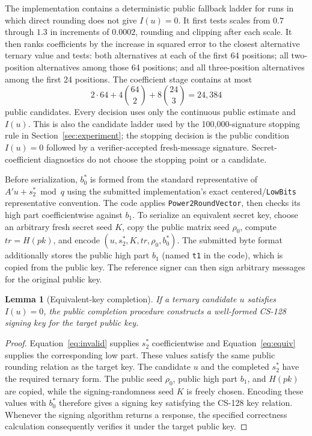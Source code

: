 \documentclass[11pt]{article}
\newtheorem{lemma}{Lemma}
\begin{document}
The implementation contains a deterministic public fallback ladder for runs in which direct
rounding does not give $I(u)=0$.  It first tests scales from $0.7$ through $1.3$ in increments
of $0.0002$, rounding and clipping after each scale.  It then ranks coefficients by the increase
in squared error to the closest alternative ternary value and tests: both alternatives at each
of the first 64 positions; all two-position alternatives among those 64 positions; and all
three-position alternatives among the first 24 positions.  The coefficient stage contains at
most
\[
 2\cdot64+4\binom{64}{2}+8\binom{24}{3}=24{,}384
\]
public candidates.  Every decision uses only the continuous public estimate and $I(u)$.  This
is also the candidate ladder used by the 100,000-signature stopping rule in
Section~\ref{sec:experiment}; the stopping decision is the public condition $I(u)=0$ followed
by a verifier-accepted fresh-message signature.  Secret-coefficient diagnostics do not choose
the stopping point or a candidate.

Before serialization, $b_0^*$ is formed from the standard representative of
$A'u+s_2^*\bmod q$ using the submitted implementation's exact centered/\texttt{LowBits}
representative convention.  The code applies \texttt{Power2RoundVector}, then checks its high
part coefficientwise against $b_1$.  To serialize an equivalent secret key, choose an
arbitrary fresh secret seed $K$, copy the public matrix seed $\rho_0$, compute
$\mathit{tr}=H(\mathit{pk})$, and encode
$(u,s_2^*,K,\mathit{tr},\rho_0,b_0^*)$.  The submitted byte format additionally stores the
public high part $b_1$ (named \texttt{t1} in the code), which is copied from the public key.
The reference signer can then sign arbitrary messages for the original public key.

\begin{lemma}[Equivalent-key completion]
If a ternary candidate $u$ satisfies $I(u)=0$, the public completion procedure constructs a
well-formed CS-128 signing key for the target public key.
\end{lemma}

\begin{proof}
Equation~\eqref{eq:invalid} supplies $s_2^*$ coefficientwise and
Equation~\eqref{eq:equiv} supplies the corresponding low part.  These values satisfy the same
public rounding relation as the target key.  The candidate $u$ and the completed $s_2^*$ have
the required ternary form.  The public seed $\rho_0$, public high part $b_1$, and
$H(\mathit{pk})$ are copied, while the signing-randomness seed $K$ is freely chosen.
Encoding these values with $b_0^*$ therefore
gives a signing key satisfying the CS-128 key relation.  Whenever the signing algorithm returns
a response, the specified correctness calculation consequently verifies it under the target
public key.
\end{proof}
\end{document}

